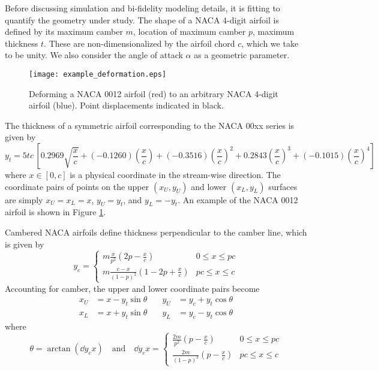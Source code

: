 \documentclass[11pt]{article}
\begin{document}
Before discussing simulation and bi-fidelity modeling details, it is fitting to quantify the geometry under study. The shape of a NACA 4-digit airfoil is defined by its maximum camber $m$, location of maximum camber $p$, maximum thickness $t$. These are non-dimensionalized by the airfoil chord $c$, which we take to be unity. We also consider the angle of attack $\alpha$ as a geometric parameter.

\begin{figure}[b]
\begin{center}
\texttt{[image: example\_deformation.eps]}
\\[1ex]
\caption{Deforming a NACA 0012 airfoil ({\color{red}red}) to an arbitrary NACA 4-digit airfoil ({\color{blue}blue}). Point displacements indicated in black.}
\label{fig:naca_deform}
\end{center}
\end{figure}

The thickness of a symmetric airfoil corresponding to the NACA 00xx series is given by
\begin{equation}
y_t = 5tc\, \left[ 0.2969 \sqrt{\frac{x}{c}} + (-0.1260) \left(\frac{x}{c}\right) + (-0.3516) \left(\frac{x}{c}\right)^2 + 0.2843 \left(\frac{x}{c}\right)^3 + (-0.1015) \left( \frac{x}{c} \right)^4 \right]
\end{equation}
where $x \in [0, c]$ is a physical coordinate in the stream-wise direction. The coordinate pairs of points on the upper $(x_U, y_U)$ and lower $(x_L, y_L)$ surfaces are simply $x_U = x_L = x$, $y_U = y_t$, and $y_L = -y_t$. An example of the NACA 0012 airfoil is shown in Figure \ref{fig:naca_deform}.

Cambered NACA airfoils define thickness perpendicular to the camber line, which is given by
\begin{equation}
y_c = \begin{cases}
m \frac{x}{p^2} \left( 2p-\frac{x}{c}\right) & 0 \le x \le pc \\
m \frac{c-x}{(1-p)^2} \left(1-2p+\frac{x}{c}\right) & pc \le x \le c
\end{cases}
\end{equation}
Accounting for camber, the upper and lower coordinate pairs become
\begin{equation}
\begin{aligned}
x_U &= x - y_t \sin \theta &\quad y_U &= y_c + y_t \cos \theta \\
x_L &= x + y_t \sin \theta &\quad y_L &= y_c - y_t \cos \theta
\end{aligned}
\end{equation}
where
\begin{equation}
\theta = \arctan \left( \dd{y_c}{x} \right)
\quad \text{and} \quad
\dd{y_c}{x} =
\begin{cases}
\frac{2m}{p^2} \left( p - \frac{x}{c} \right) & 0 \le x \le pc \\
\frac{2m}{(1-p)^2} \left( p - \frac{x}{c} \right) & pc \le x \le c
\end{cases}
\end{equation}
\end{document}
